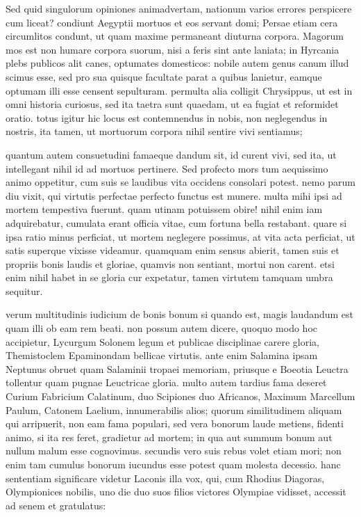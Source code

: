  Sed quid singulorum opiniones animadvertam, nationum varios errores perspicere cum liceat? condiunt Aegyptii mortuos et eos servant domi; Persae etiam cera circumlitos condunt, ut quam maxime permaneant diuturna corpora. Magorum mos est non humare corpora suorum, nisi a feris sint ante laniata; in Hyrcania plebs publicos alit canes, optumates domesticos: nobile autem genus canum illud scimus esse, sed pro sua quisque facultate parat a quibus lanietur, eamque optumam illi esse censent sepulturam. permulta alia colligit Chrysippus, ut est in omni historia curiosus, sed ita taetra sunt quaedam, ut ea fugiat et reformidet oratio. totus igitur hic locus est contemnendus in nobis, non neglegendus in nostris, ita tamen, ut mortuorum corpora nihil sentire vivi sentiamus;

 quantum autem consuetudini famaeque dandum sit, id curent vivi, sed ita, ut intellegant nihil id ad mortuos pertinere. Sed profecto mors tum aequissimo animo oppetitur, cum suis se laudibus vita occidens consolari potest. nemo parum diu vixit, qui virtutis perfectae perfecto functus est munere. multa mihi ipsi ad mortem tempestiva fuerunt. quam utinam potuissem obire! nihil enim iam adquirebatur, cumulata erant officia vitae, cum fortuna bella restabant. quare si ipsa ratio minus perficiat, ut mortem neglegere possimus, at vita acta perficiat, ut satis superque vixisse videamur. quamquam enim sensus abierit, tamen suis et propriis bonis laudis et gloriae, quamvis non sentiant, mortui non carent. etsi enim nihil habet in se gloria cur expetatur, tamen virtutem tamquam umbra sequitur.

 verum multitudinis iudicium de bonis bonum si quando est, magis laudandum est quam illi ob eam rem beati. non possum autem dicere, quoquo modo hoc accipietur, Lycurgum Solonem legum et publicae disciplinae carere gloria, Themistoclem Epaminondam bellicae virtutis. ante enim Salamina ipsam Neptunus obruet quam Salaminii tropaei memoriam, priusque e Boeotia Leuctra tollentur quam pugnae Leuctricae gloria. multo autem tardius fama deseret Curium Fabricium Calatinum, duo Scipiones duo Africanos, Maximum Marcellum Paulum, Catonem Laelium, innumerabilis alios; quorum similitudinem aliquam qui arripuerit, non eam fama populari, sed vera bonorum laude metiens, fidenti animo, si ita res feret, gradietur ad mortem; in qua aut summum bonum aut nullum malum esse cognovimus. secundis vero suis rebus volet etiam mori; non enim tam cumulus bonorum iucundus esse potest quam molesta decessio. hanc sententiam significare videtur Laconis illa vox, qui, cum Rhodius Diagoras, Olympionices nobilis, uno die duo suos filios victores Olympiae vidisset, accessit ad senem et gratulatus:


